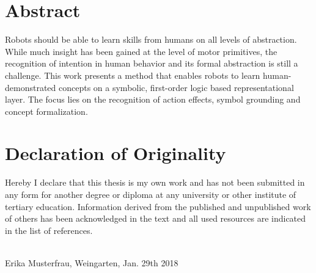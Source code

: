 \section*{Abstract}
Robots should be able to learn skills from humans on all levels of abstraction. While much insight has been gained at the level of motor primitives, the recognition of intention in human behavior and its formal abstraction is still a challenge. This work presents a method that enables robots to learn human-demonstrated concepts on a symbolic, first-order logic based representational layer. The focus lies on the recognition of action effects, symbol grounding and concept formalization.


\vspace*{13cm}

\section*{Declaration of Originality}
Hereby I declare that this thesis is my own work and has not been submitted in any form for another degree or diploma at any university or other institute of tertiary education. Information derived from the published and unpublished work of others has been acknowledged in the text and all used resources are indicated in the list of references.

\vspace{1cm}

\underline{\hspace{5cm}}\\

Erika Musterfrau, Weingarten, Jan. 29th 2018
